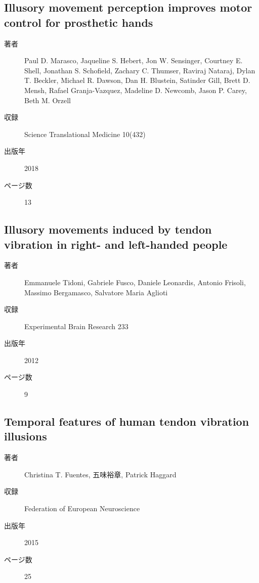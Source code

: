 \documentclass[]{jsarticle}
\begin{document}
    \subsection{Illusory movement perception improves motor control for prosthetic hands}
        \begin{description}
            \item[著者] Paul D. Marasco, Jaqueline S. Hebert, Jon W. Sensinger, Courtney E. Shell, Jonathan S. Schofield, Zachary C. Thumser, Raviraj Nataraj, Dylan T. Beckler, Michael R. Dawson, Dan H. Blustein, Satinder Gill, Brett D. Mensh, Rafael Granja-Vazquez, Madeline D. Newcomb, Jason P. Carey, Beth M. Orzell
            \item[収録] Science Translational Medicine 10(432)
            \item[出版年] 2018
            \item[ページ数] 13
        \end{description}

    \subsection{Illusory movements induced by tendon vibration in right- and left-handed people}
        \begin{description}
            \item[著者] Emmanuele Tidoni, Gabriele Fusco, Daniele Leonardis, Antonio Frisoli, Massimo Bergamasco, Salvatore Maria Aglioti
            \item[収録] Experimental Brain Research 233
            \item[出版年] 2012
            \item[ページ数] 9
        \end{description}

    \subsection{Temporal features of human tendon vibration illusions}
        \begin{description}
            \item[著者] Christina T. Fuentes, 五味裕章, Patrick Haggard
            \item[収録] Federation of European Neuroscience
            \item[出版年] 2015
            \item[ページ数] 25
        \end{description}
\end{document}
